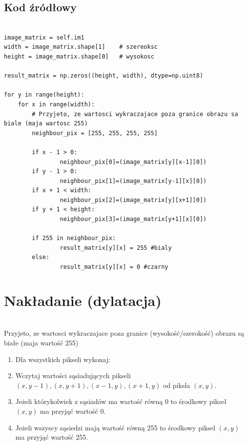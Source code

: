 \documentclass[final,a4paper,openany,12pt]{mwbk}
\begin{document}
\subsection*{Kod źródłowy}

\begin{lstlisting}[caption= Operacja okrawania (erozji) na obrazie binarnym]

image_matrix = self.im1
width = image_matrix.shape[1]    # szereoksc
height = image_matrix.shape[0]   # wysokosc

result_matrix = np.zeros((height, width), dtype=np.uint8)

for y in range(height):
    for x in range(width):  
        # Przyjeto, ze wartosci wykraczajace poza granice obrazu sa biale (maja wartosc 255)
        neighbour_pix = [255, 255, 255, 255]

        if x - 1 > 0:
                neighbour_pix[0]=(image_matrix[y][x-1][0])
        if y - 1 > 0:
                neighbour_pix[1]=(image_matrix[y-1][x][0])
        if x + 1 < width:
                neighbour_pix[2]=(image_matrix[y][x+1][0])
        if y + 1 < height:
                neighbour_pix[3]=(image_matrix[y+1][x][0])

        if 255 in neighbour_pix:
                result_matrix[y][x] = 255 #bialy
        else:
                result_matrix[y][x] = 0 #czarny   

\end{lstlisting}
\newpage

\section{ Nakładanie (dylatacja)}
\hfill\\
\indent
       Przyjeto, ze wartosci wykraczajace poza granice (wysokość/szerokość) obrazu są białe (maja wartość 255)\\
	\begin{enumerate}	
		\item Dla wszystkich pikseli wykonaj:
		\item Wczytaj wartości sąsiadujących pikseli $(x,y-1),(x,y+1),(x-1,y),(x+1,y)$ od piksla $(x,y)$.
		\item Jeżeli którykolwiek z sąsiadów ma wartość równą 0 to środkowy piksel $(x,y)$ ma przyjąć wartość 0. 
		\item Jeżeli wszyscy sąsiedzi mają wartość równą 255 to środkowy piksel $(x,y)$ ma przyjąć wartość 255.
	\end{enumerate}
\end{document}
